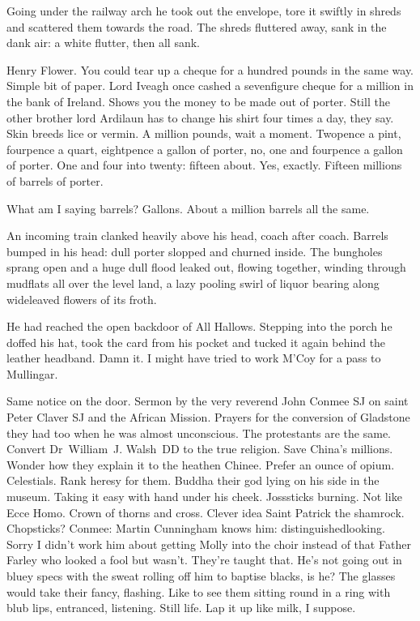 Going under the railway arch
he took out the envelope,
tore it swiftly in shreds
and scattered them towards the road.
The shreds fluttered away,
sank in the dank air:
a white flutter, then all sank.

Henry Flower.
You could tear up a cheque for a hundred pounds in the same way.
Simple bit of paper.
Lord Iveagh once cashed a sevenfigure cheque for a million in the bank of Ireland.
Shows you the money to be made out of porter.
Still the other brother
lord Ardilaun
has to change his shirt four times a day,
they say.
Skin breeds lice or vermin.
A million pounds, wait a moment.
Twopence a pint,
fourpence a quart,
eightpence a gallon of porter,
no, one and fourpence a gallon of porter.
One and four into twenty:
fifteen about.
Yes, exactly.
Fifteen millions of barrels of porter.

What am I saying barrels?
Gallons.
About a million barrels all the same.

An incoming train clanked heavily above his head, coach after coach.
Barrels bumped in his head:
dull porter slopped and churned inside.
The bungholes sprang open and a huge dull flood leaked out,
flowing together,
winding through mudflats all over the level land,
a lazy pooling swirl of liquor
bearing along wideleaved flowers of its froth.

He had reached the open backdoor of All Hallows.
Stepping into the porch
he doffed his hat,
took the card from his pocket
and tucked it again behind the leather headband.
Damn it.
I might have tried to work M'Coy for a pass to Mullingar.

Same notice on the door.
Sermon by the very reverend John Conmee SJ
on saint Peter Claver SJ and the African Mission.
Prayers for the conversion of Gladstone they had too
when he was almost unconscious.
The protestants are the same.
Convert Dr~William~J. Walsh~DD to the true religion.
Save China's millions.
Wonder how they explain it to the heathen Chinee.
Prefer an ounce of opium.
Celestials.
Rank heresy for them.
Buddha their god lying on his side in the museum.
Taking it easy
with hand under his cheek.
Josssticks burning.
Not like Ecce Homo.
Crown of thorns and cross.
Clever idea
Saint Patrick the shamrock.
Chopsticks?
Conmee:
Martin Cunningham knows him:
distinguishedlooking.
Sorry I didn't work him about getting Molly into the choir
instead of that Father Farley who looked a fool but wasn't.
They're taught that.
He's not going out in bluey specs
with the sweat rolling off him to baptise blacks,
is he?
The glasses would take their fancy, flashing.
Like to see them sitting round in a ring with blub lips,
entranced, listening.
Still life.
Lap it up like milk, I suppose.


